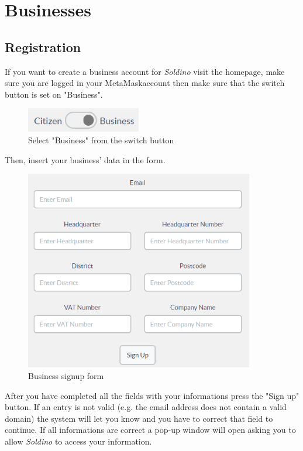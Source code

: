 \section{Businesses}
	\subsection{Registration}
	If you want to create a business account for \textit{Soldino} visit the 
	homepage, make sure you are logged in your MetaMask\glosp account
	then make sure that the switch button is set on "Business".\\
	\begin{figure}[H]
		\includegraphics[width=5cm]{res/images/user_business.png}
		\centering
		\caption{Select "Business" from the switch button}
	\end{figure}	
	\noindent Then, insert your business' data in the form.
	\begin{figure}[H]
		\includegraphics[width=10cm]{res/images/business_signup.png}
		\centering
		\caption{Business signup form}
	\end{figure}
	\noindent After you have completed 
	all the	fields with your informations press the "Sign up" button. If an 
	entry is not valid (e.g. the email address does not contain a valid 
	domain) the system will let you know and you have to correct that field 
	to continue. If all informations are correct a pop-up window will open 
	asking you to allow \textit{Soldino} to access your information.\\
